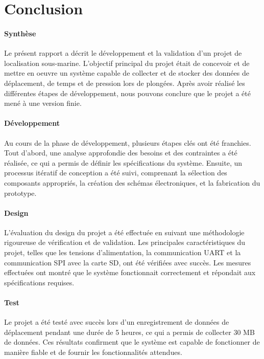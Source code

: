 \documentclass[12pt,a4paper,twoside]{article}
\begin{document}
\section{Conclusion}
{
	\paragraph{Synthèse} Le présent rapport a décrit le développement et la validation d'un projet de localisation sous-marine. L'objectif principal du projet était de concevoir et de mettre en oeuvre un système capable de collecter et de stocker des données de déplacement, de temps et de pression lors de plongées. Après avoir réalisé les différentes étapes de développement, nous pouvons conclure que le projet a été mené à une version finie.
	
	\paragraph{Développement} Au cours de la phase de développement, plusieurs étapes clés ont été franchies. Tout d'abord, une analyse approfondie des besoins et des contraintes a été réalisée, ce qui a permis de définir les spécifications du système. Ensuite, un processus itératif de conception a été suivi, comprenant la sélection des composants appropriés, la création des schémas électroniques, et la fabrication du prototype.
	
	\paragraph{Design} L'évaluation du design du projet a été effectuée en suivant une méthodologie rigoureuse de vérification et de validation. Les principales caractéristiques du projet, telles que les tensions d'alimentation, la communication UART et la communication SPI avec la carte SD, ont été vérifiées avec succès. Les mesures effectuées ont montré que le système fonctionnait correctement et répondait aux spécifications requises.
	
	\paragraph{Test} Le projet a été testé avec succès lors d'un enregistrement de données de déplacement pendant une durée de 5 heures, ce qui a permis de collecter 30 MB de données. Ces résultats confirment que le système est capable de fonctionner de manière fiable et de fournir les fonctionnalités attendues.
	
}
\end{document}
